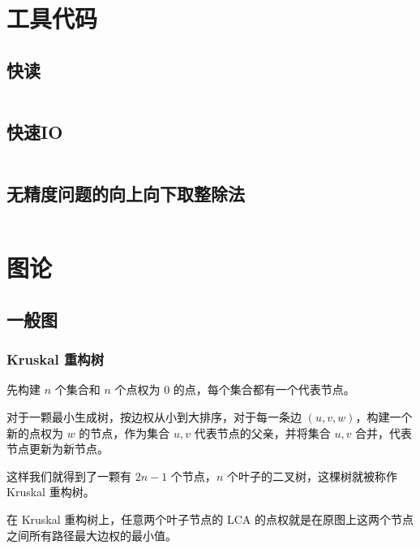 \documentclass[twoside,twocolumn]{article}
\begin{document}
\newpage
\section{工具代码}
\subsection{快读}
\inputminted[breaklines, frame=single]{c++}{../algo/杂项/快读.cpp}


\subsection{快速IO}
\inputminted[breaklines, frame=single]{c++}{../algo/杂项/快速IO.cpp}


\subsection{无精度问题的向上向下取整除法}
\inputminted[breaklines, frame=single]{c++}{../algo/杂项/整数取整除法.cpp}


\section{图论} %

\subsection{一般图}




\subsubsection{Kruskal 重构树} %


先构建 $n$ 个集合和 $n$ 个点权为 $0$ 的点，每个集合都有一个代表节点。

对于一颗最小生成树，按边权从小到大排序，对于每一条边 $(u,v,w)$，构建一个新的点权为 $w$ 的节点，作为集合 $u,v$ 代表节点的父亲，并将集合 $u,v$ 合并，代表节点更新为新节点。

这样我们就得到了一颗有 $2n-1$ 个节点，$n$ 个叶子的二叉树，这棵树就被称作 Kruskal 重构树。


在 Kruskal 重构树上，任意两个叶子节点的 LCA 的点权就是在原图上这两个节点之间所有路径最大边权的最小值。
\end{document}
